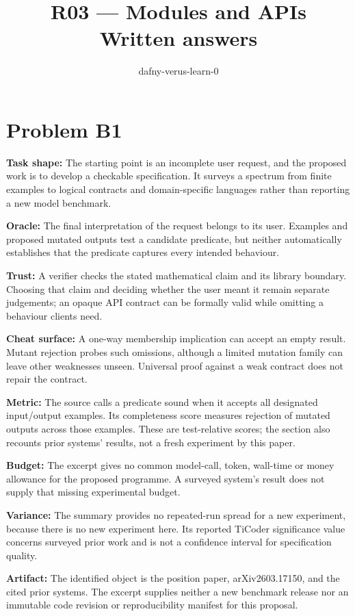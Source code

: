\documentclass[11pt]{article}
\title{R03 --- Modules and APIs \\ \large Written answers}
\author{dafny-verus-learn-0}
\date{}
\begin{document}
\maketitle
\section*{Problem B1}\label{ans:B1}
\begin{answer}
\textbf{Task shape:} The starting point is an incomplete user request, and the proposed work is to develop a checkable specification. It surveys a spectrum from finite examples to logical contracts and domain-specific languages rather than reporting a new model benchmark.

\textbf{Oracle:} The final interpretation of the request belongs to its user. Examples and proposed mutated outputs test a candidate predicate, but neither automatically establishes that the predicate captures every intended behaviour.

\textbf{Trust:} A verifier checks the stated mathematical claim and its library boundary. Choosing that claim and deciding whether the user meant it remain separate judgements; an opaque API contract can be formally valid while omitting a behaviour clients need.

\textbf{Cheat surface:} A one-way membership implication can accept an empty result. Mutant rejection probes such omissions, although a limited mutation family can leave other weaknesses unseen. Universal proof against a weak contract does not repair the contract.

\textbf{Metric:} The source calls a predicate sound when it accepts all designated input/output examples. Its completeness score measures rejection of mutated outputs across those examples. These are test-relative scores; the section also recounts prior systems' results, not a fresh experiment by this paper.

\textbf{Budget:} The excerpt gives no common model-call, token, wall-time or money allowance for the proposed programme. A surveyed system's result does not supply that missing experimental budget.

\textbf{Variance:} The summary provides no repeated-run spread for a new experiment, because there is no new experiment here. Its reported TiCoder significance value concerns surveyed prior work and is not a confidence interval for specification quality.

\textbf{Artifact:} The identified object is the position paper, arXiv2603.17150, and the cited prior systems. The excerpt supplies neither a new benchmark release nor an immutable code revision or reproducibility manifest for this proposal.
\end{answer}
\end{document}
